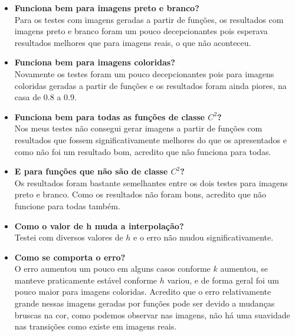 \documentclass[leqno]{article}
\begin{document}
\begin{itemize}
    \item \textbf{Funciona bem para imagens preto e branco?} \\
        Para os testes com imagens geradas a partir de funções, os resultados
        com imagens preto e branco foram um pouco decepcionantes pois esperava
        resultados melhores que para imagens reais, o que não aconteceu.

    \item \textbf{Funciona bem para imagens coloridas?} \\
        Novamente os testes foram um pouco decepcionantes pois para imagens coloridas geradas
        a partir de funções e os resultados foram ainda piores, na casa de 0.8 a 0.9.

    \item \textbf{Funciona bem para todas as funções de classe $C^2$?} \\
        Nos meus testes não consegui gerar imagens a partir de funções com resultados
        que fossem significativamente melhores do que os apresentados e como não
        foi um resultado bom, acredito que não funciona para todas.

    \item \textbf{E para funções que não são de classe $C^2$?} \\
        Os resultados foram bastante semelhantes entre os dois testes para
        imagens preto e branco. Como os resultados não foram bons, acredito
        que não funcione para todas também.

    \item \textbf{Como o valor de h muda a interpolação?} \\
        Testei com diversos valores de $h$ e o erro não mudou significativamente.
    
    \item \textbf{Como se comporta o erro?} \\
        O erro aumentou um pouco em alguns casos conforme $k$ aumentou, se manteve praticamente
        estável conforme $h$ variou, e de forma geral foi um pouco maior para imagens
        coloridas. Acredito que o erro relativamente grande nessas imagens geradas por funções
        pode ser devido a mudanças bruscas na cor, como podemos observar nas imagens,
        não há uma suavidade nas transições como existe em imagens reais.
        

\end{itemize}
\end{document}
